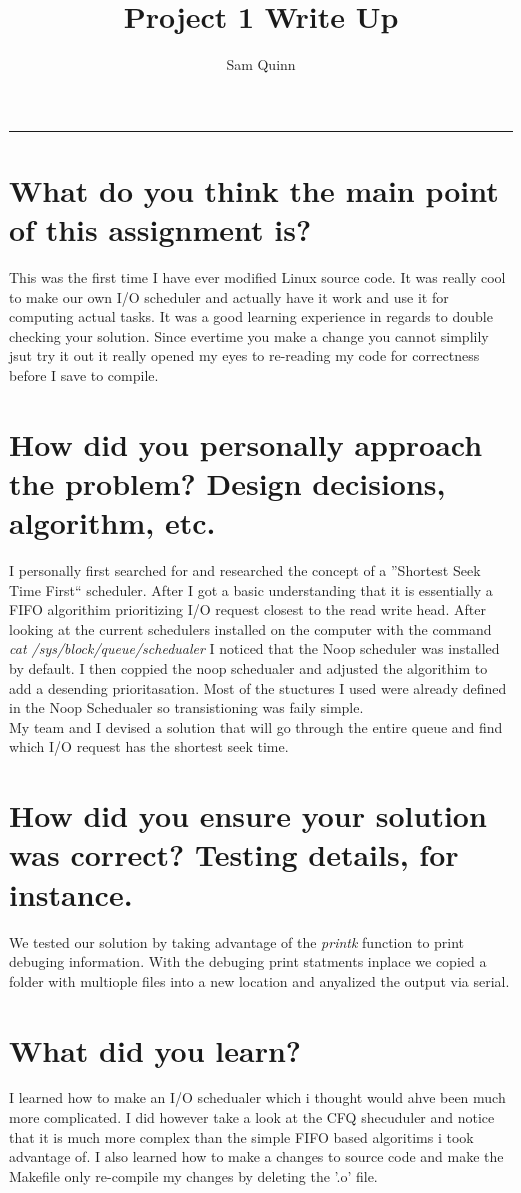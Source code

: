 \documentclass[letterpaper,10pt,notitlepage,fleqn]{article}
\title{Project 1 Write Up}
\author{Sam Quinn}
\begin{document}
\maketitle
\hrule

\section*{What do you think the main point of this assignment is?}
This was the first time I have ever modified Linux source code. It was really cool 
to make our own I/O scheduler and actually have it work and use it for computing 
actual tasks. It was a good learning experience in regards to  double checking 
your solution. Since evertime you make a change you cannot simplily jsut try it out 
it really opened my eyes to re-reading my code for correctness before I save to compile.
\section*{How did you personally approach the problem? Design decisions, algorithm, etc.}
I personally first searched for and researched the concept of a ''Shortest Seek Time First`` 
scheduler. After I got a basic understanding that it is essentially a FIFO algorithim 
prioritizing I/O request closest to the read write head. After looking at the current 
schedulers installed on the computer with the command \textit{cat /sys/block/queue/schedualer} 
I noticed that the Noop scheduler was installed by default. I then coppied the noop schedualer 
and adjusted the algorithim to add a desending prioritasation. Most of the stuctures I used 
were already defined in the Noop Schedualer so transistioning was faily simple. \\ My team 
and I devised a solution that will go through the entire queue and find which I/O request 
has the shortest seek time.
\section*{How did you ensure your solution was correct? Testing details, for instance.}
We tested our solution by taking advantage of the \textit{printk} function to print debuging 
information. With the debuging print statments inplace we copied a folder with multiople files 
into a new location and anyalized the output via serial. 
\section*{What did you learn?}
I learned how to make an I/O schedualer which i thought would ahve been much more complicated. I did however take a look at the CFQ shecuduler and notice that it is much more complex than the simple FIFO based algoritims i took advantage of. I also learned how to make a changes to source code and make the Makefile only re-compile my changes by deleting the '.o' file.
\end{document}
